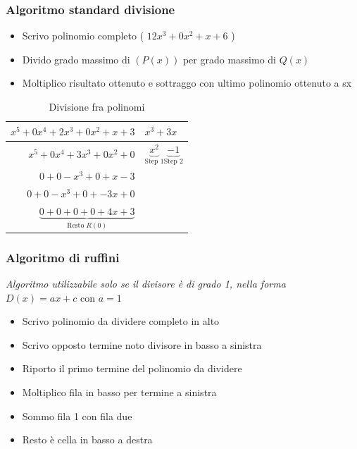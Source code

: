 \subsubsection{Algoritmo standard divisione}

\begin{itemize}
	\item Scrivo polinomio completo ( $12x^3 + 0 x^2 + x + 6$ )
	\item Divido grado massimo di $\left( P\left( x \right)  \right) $ per grado massimo di $Q\left( x \right) $
	\item Moltiplico risultato ottenuto e sottraggo con ultimo polinomio ottenuto a sx
\end{itemize}
\begin{table}[h!]
	\centering
	\caption{Divisione fra polinomi}
	\label{tab:label}
	\begin{tabular}{r|l}
		$ x^{5} + 0 x^{4}+ 2x^{3} + 0 x^{2} + x + 3$ & $x^{3}+ 3x$                                                           \\
		\hline
		$ x^{5} + 0 x^{4}+ 3x^{3} + 0 x^{2} +0 $     & $ \underbrace{x^{2}}_{\text{Step 1}} \underbrace{-1}_{\text{Step 2}}$ \\
		$ 0 + 0 - x^{3} + 0 + x - 3$                 &                                                                       \\
		$ 0 + 0 - x^{3} + 0 + -3x + 0$               &                                                                       \\
		$ \underbrace{0+0+0+0+4x+3}_{\text{Resto } R\left( 0 \right) } $
	\end{tabular}
\end{table}

\subsubsection{Algoritmo di ruffini}
\label{sec:algoritmodiruffini}
\textit{Algoritmo utilizzabile solo se il divisore è di grado 1, nella forma} $D\left( x \right) = ax + c \text{ con } a = 1$
\begin{itemize}
	\item Scrivo polinomio da dividere completo in alto
	\item Scrivo opposto termine noto divisore in basso a sinistra
	\item Riporto il primo termine del polinomio da dividere
	\item Moltiplico fila in basso per termine a sinistra
	\item Sommo fila 1 con fila due
	\item Resto è cella in basso a destra
\end{itemize}

